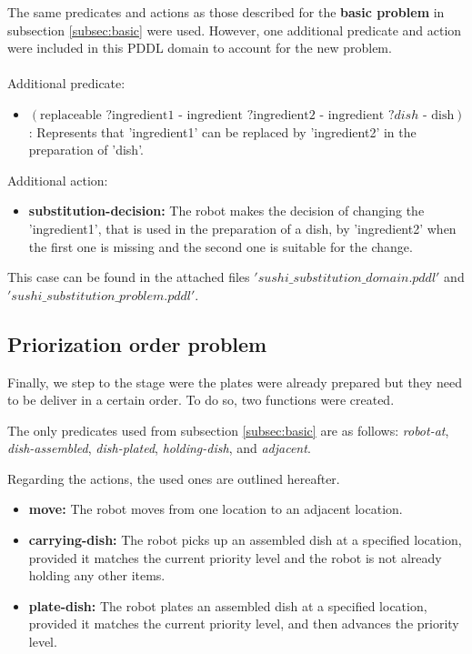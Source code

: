 The same predicates and actions as those described for the \textbf{basic problem} in subsection \ref{subsec:basic} were used. 
However, one additional predicate and action were included in this PDDL domain to account for the new problem.
\\ \\ 
Additional predicate:
\begin{itemize}
  \item $ (\text{replaceable } ? \text{ingredient1 - ingredient }  ? \text{ingredient2 - ingredient }  ?dish  \text{ - dish}) $: Represents that 'ingredient1' can be replaced by 'ingredient2' in the preparation of 'dish'.
\end{itemize}
Additional action:
\begin{itemize}
  \item \textbf{substitution-decision:} The robot makes the decision of changing the 'ingredient1', that is used in the preparation of 
  a dish, by 'ingredient2' when the first one is missing and the second one is suitable for the change.
\end{itemize}

This case can be found in the attached files $'sushi\_substitution\_domain.pddl'$ and $'sushi\_substitution\_problem.pddl'$.

\subsection{Priorization order problem}

Finally, we step to the stage were the plates were already prepared but they need to be deliver in a certain order. To do so, two 
functions were created. 

The only predicates used from subsection \ref{subsec:basic} are as follows: \textit{robot-at}, \textit{dish-assembled}, 
\textit{dish-plated}, \textit{holding-dish}, and \textit{adjacent}. 

Regarding the actions, the used ones are outlined hereafter.
\begin{itemize}
    \item \textbf{move:} The robot moves from one location to an adjacent location.
    \item \textbf{carrying-dish:} The robot picks up an assembled dish at a specified location, provided it matches the current priority level and the robot is not already holding any other items.
    \item \textbf{plate-dish:} The robot plates an assembled dish at a specified location, provided it matches the current priority level, and then advances the priority level.
\end{itemize}



